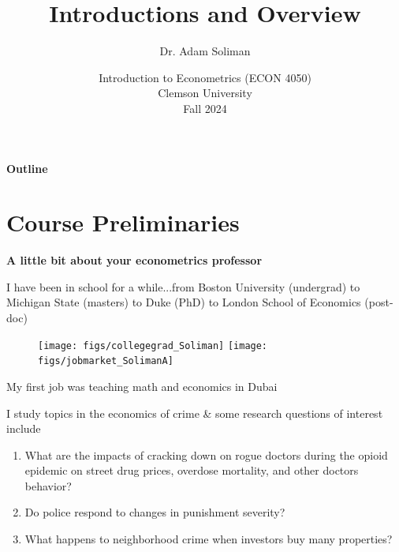 \documentclass[11pt, aspectratio=169]{beamer}
\newenvironment{wideitemize}{\itemize\addtolength{\itemsep}{5pt}}{\enditemize}
\begin{document}
	 

\title{Introductions and Overview}
\author{Dr. Adam Soliman}
\date{Introduction to Econometrics (ECON 4050) \\ Clemson University\\Fall 2024} 

\begin{frame}
	\maketitle
\end{frame}	
 
\begin{frame}{\bf \large Outline}
	\tableofcontents
\end{frame} 

\section{Course Preliminaries}

\begin{frame}{\bf \large A little bit about your econometrics professor}
	
	\begin{wideitemize}
		\item I have been in school for a while...from Boston University (undergrad) to Michigan State (masters) to Duke (PhD) to London School of Economics (post-doc)
\begin{figure}[htbp!]
	\centering
	\texttt{[image: figs/collegegrad\_Soliman]} \texttt{[image: figs/jobmarket\_SolimanA]}
\end{figure}		
		\item My first job was teaching math and economics in Dubai

\pause 
		\item I study topics in the economics of crime \& some research questions of interest include
		\begin{enumerate}
			\item What are the impacts of cracking down on rogue doctors during the opioid epidemic on street drug prices, overdose mortality, and other doctors behavior?
			\item Do police respond to changes in punishment severity?
			\item What happens to neighborhood crime when investors buy many properties?
		\end{enumerate}
	\end{wideitemize}
\end{frame}
\end{document}
